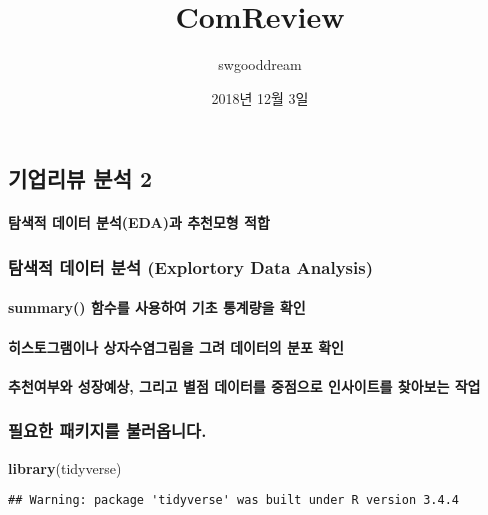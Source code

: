 \documentclass[]{article}
\title{ComReview}
\author{swgooddream}
\date{2018년 12월 3일}
\newenvironment{Shaded}{\begin{snugshade}}{\end{snugshade}}
\newcommand{\KeywordTok}[1]{\textcolor[rgb]{0.13,0.29,0.53}{\textbf{#1}}}
\newcommand{\NormalTok}[1]{#1}
\let\oldparagraph\paragraph
\renewcommand{\paragraph}[1]{\oldparagraph{#1}\mbox{}}
\begin{document}
\maketitle

\subsection{기업리뷰 분석 2}\label{--2}

\paragraph{탐색적 데이터 분석(EDA)과 추천모형 적합}\label{--eda--}

\subsubsection{탐색적 데이터 분석 (Explortory Data
Analysis)}\label{---explortory-data-analysis}

\paragraph{summary() 함수를 사용하여 기초 통계량을
확인}\label{summary-----}

\paragraph{히스토그램이나 상자수염그림을 그려 데이터의 분포
확인}\label{-----}

\paragraph{추천여부와 성장예상, 그리고 별점 데이터를 중점으로 인사이트를
찾아보는 작업}\label{--------}

\subsubsection{필요한 패키지를 불러옵니다.}\label{--.}

\begin{Shaded}
\begin{Highlighting}[]
\KeywordTok{library}\NormalTok{(tidyverse)}
\end{Highlighting}
\end{Shaded}

\begin{verbatim}
## Warning: package 'tidyverse' was built under R version 3.4.4
\end{verbatim}
\end{document}
